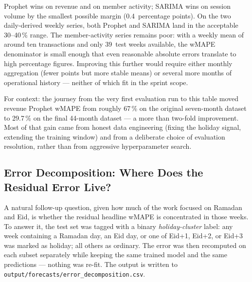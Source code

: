 Prophet wins on revenue and on member activity; SARIMA wins on session
volume by the smallest possible margin (0.4~percentage points). On the two
daily-derived weekly series, both Prophet and SARIMA land in the acceptable
30--40\,\% range. The member-activity series remains poor: with a weekly
mean of around ten transactions and only 39~test weeks available, the
wMAPE denominator is small enough that even reasonable absolute errors
translate to high percentage figures. Improving this further would require
either monthly aggregation (fewer points but more stable means) or several
more months of operational history --- neither of which fit in the sprint
scope.

For context: the journey from the very first evaluation run to this table
moved revenue Prophet wMAPE from roughly 67\,\% on the original seven-month
dataset to 29.7\,\% on the final 44-month dataset --- a more than two-fold
improvement. Most of that gain came from honest data engineering (fixing the
holiday signal, extending the training window) and from a deliberate choice
of evaluation resolution, rather than from aggressive hyperparameter search.

\subsection{Error Decomposition: Where Does the Residual Error Live?}

A natural follow-up question, given how much of the work focused on Ramadan
and Eid, is whether the residual headline wMAPE is concentrated in those
weeks. To answer it, the test set was tagged with a binary
\textit{holiday-cluster} label: any week containing a Ramadan day, an Eid day,
or one of Eid+1, Eid+2, or Eid+3 was marked as holiday; all others as
ordinary. The error was then recomputed on each subset separately while
keeping the same trained model and the same predictions --- nothing was
re-fit. The output is written to
\texttt{output/forecasts/error\_decomposition.csv}.


